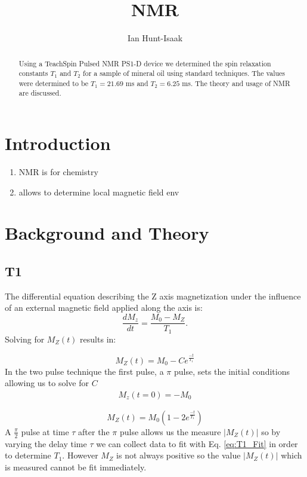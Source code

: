 \documentclass[11pt,letterpaper]{article}
\title{NMR}
\date{}
\author{Ian Hunt-Isaak}
\begin{document}
\maketitle
\begin{abstract}
Using a TeachSpin Pulsed NMR PS1-D device we determined the spin relaxation constants $T_1$ and $T_2$ for a sample of mineral oil using standard techniques. The values were determined to be $T_1=21.69$ ms and $T_2=6.25$ ms. The theory and usage of NMR are discussed.
\end{abstract}
\section{Introduction}
\begin{enumerate}
\item NMR is for chemistry
\item allows to determine local magnetic field env
\end{enumerate}
\section{Background and Theory}


\subsection{T1}
\label{sub:T1_Theory}
The differential equation describing the Z axis magnetization under the influence of an external magnetic field applied along the axis is:
\begin{equation}
	\frac{dM_z}{dt}=\frac{M_0 - M_Z}{T_1}.
\end{equation}
Solving for $M_Z(t)$ results in:

\begin{equation}
\label{eq:T1_Fit}
	M_Z(t) = M_0-Ce^{\frac{-t}{T_1}}
\end{equation}
In the two pulse technique the first pulse, a $\pi$ pulse, sets the initial conditions allowing us to solve for $C$
\begin{align*}
	M_z(t=0)=-M_0
\end{align*}

\begin{equation}
\label{eq:Mz}
	M_Z(t) = M_0(1-2e^{\frac{-t}{T_1}})
\end{equation}
A $\frac{\pi}{2}$ pulse at time $\tau$ after the $\pi$ pulse allows us the measure $|M_Z(t)|$ so by varying the delay time $\tau$ we can collect data to fit with Eq. \ref{eq:T1_Fit} in order to determine $T_1$. However $M_Z$ is not always positive so the value $|M_Z(t)|$ which is measured cannot be fit immediately. 
\end{document}

